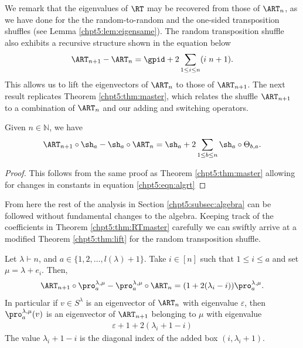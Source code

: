 \documentclass[11pt]{report}
\begin{document}
We remark that the eigenvalues of $\RT$ may be recovered from those of $\ART_{n}$, as we have done for the the random-to-random and the one-sided transposition shuffles (see Lemma \ref{chpt5:lem:eigensame}). The random transposition shuffle also exhibits a recursive structure shown in the equation below
\begin{eqnarray}
\ART_{n+1} - \ART_{n} = \gpid + 2 \sum_{1\leq i \leq n} ( i \hspace{0.3em} n+1). \label{chpt5:eqn:rtdifference}
\end{eqnarray}
This allows us to lift the eigenvectors of $\ART_{n}$ to those of $\ART_{n+1}$. The next result replicates Theorem \ref{chpt5:thm:master}, which relates the shuffle $\ART_{n+1}$ to a combination of $\ART_{n}$ and our adding and switching operators.

\begin{thm}
	\label{chpt5:thm:RTmaster}
	Given $n\in\mathbb{N}$, we have
	\begin{eqnarray}
	\ART_{n+1} \circ \sh_{a} - \sh_{a} \circ \ART_{n} = \sh_{a} + 2 \sum_{1 \leq b \leq n} \sh_{a}\circ \Theta_{b,a}.
	\end{eqnarray}
\end{thm}
\begin{proof}
	This follows from the same proof as Theorem \ref{chpt5:thm:master} allowing for changes in constants in equation \eqref{chpt5:eqn:algrt}
\end{proof}

From here the rest of the analysis in Section \ref{chpt5:subsec:algebra} can be followed without fundamental changes to the algebra. Keeping track of the coefficients in Theorem \ref{chpt5:thm:RTmaster} carefully we can swiftly arrive at a modified Theorem \ref{chpt5:thm:lift} for the random transposition shuffle.

\begin{thm}
	\label{chpt5:thm:RTlift}
	
	
	Let $\lambda \vdash n$, and  $a \in \{1,2,\ldots,l(\lambda)+1\}$. Take $i\in [n]$ such that  $1 \leq i \leq a$ and set $\mu = \lambda +e_{i}$. Then,
	\begin{eqnarray}
	\ART_{n+1} \circ \pro_{a}^{\lambda,\mu} - 
	\pro_{a}^{\lambda,\mu} \circ \ART_{n} = (1 + 2(\lambda_{i}-i)) \pro_{a}^{\lambda,\mu} .
	\end{eqnarray}
	In particular if $v \in S^{\lambda}$ is an eigenvector of $\ART_{n}$ 
	with eigenvalue $\varepsilon$, then  
	$\pro_{a}^{\lambda,\mu}(v)$ is an eigenvector of 
	$\ART_{n+1}$ belonging to $\mu$ with eigenvalue 
	\begin{eqnarray}
	\varepsilon + 1 + 2(\lambda_{i}+1-i)
	\end{eqnarray}
	The value $\lambda_{i}+1- i$ is the diagonal index of the added box $(i,\lambda_{i}+1)$.
\end{thm}
\end{document}
